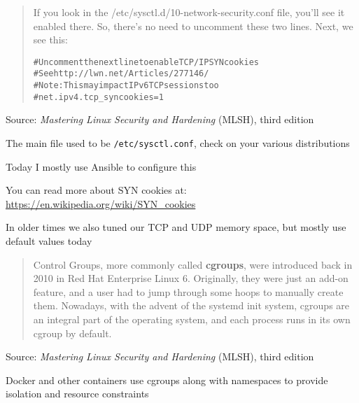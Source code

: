 \documentclass[Screen16to9,17pt]{foils}
\begin{document}



\begin{quote}
If you look in the /etc/sysctl.d/10-network-security.conf file, you’ll see
it enabled there. So, there’s no need to uncomment these two lines.
Next, we see this:
\begin{alltt}
# Uncomment the next line to enable TCP/IP SYN cookies
# See http://lwn.net/Articles/277146/
# Note: This may impact IPv6 TCP sessions too
#net.ipv4.tcp_syncookies=1
\end{alltt}
\end{quote}
Source: \emph{Mastering Linux Security and Hardening} (MLSH), third edition

\begin{list2}
\item The main file used to be \verb+/etc/sysctl.conf+, check on your various distributions
\item Today I mostly use Ansible to configure this
\item You can read more about SYN cookies at: \url{https://en.wikipedia.org/wiki/SYN_cookies}
\item In older times we also tuned our TCP and UDP memory space, but mostly use default values today
\end{list2}





\begin{quote}
Control Groups, more commonly called {\bf cgroups}, were introduced back in 2010 in Red Hat Enterprise Linux 6. Originally, they were just an add-on feature, and a user had to jump through some hoops to manually create them. Nowadays, with the advent of the systemd init system, cgroups are an integral part of the operating system, and each process runs in its own cgroup by default.
\end{quote}
Source: \emph{Mastering Linux Security and Hardening} (MLSH), third edition

\begin{list2}
    \item Docker and other containers use cgroups along with namespaces to provide isolation and resource constraints
\end{list2}


\end{document}

